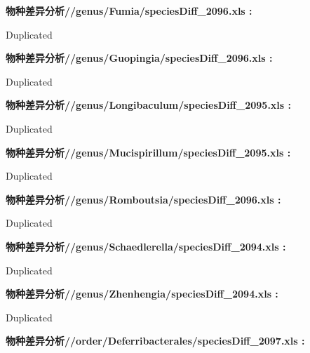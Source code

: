 \documentclass[
]{article}
\begin{document}
\begin{center}
\begin{tcolorbox}[colback=gray!10, colframe=gray!50, width=0.9\linewidth, arc=1mm, boxrule=0.5pt]
\vspace{2em}


\textbf{
物种差异分析//genus/Fumia/speciesDiff\_2096.xls
:}

\vspace{0.5em}

    Duplicated

\vspace{2em}


\textbf{
物种差异分析//genus/Guopingia/speciesDiff\_2096.xls
:}

\vspace{0.5em}

    Duplicated

\vspace{2em}


\textbf{
物种差异分析//genus/Longibaculum/speciesDiff\_2095.xls
:}

\vspace{0.5em}

    Duplicated

\vspace{2em}


\textbf{
物种差异分析//genus/Mucispirillum/speciesDiff\_2095.xls
:}

\vspace{0.5em}

    Duplicated

\vspace{2em}


\textbf{
物种差异分析//genus/Romboutsia/speciesDiff\_2096.xls
:}

\vspace{0.5em}

    Duplicated

\vspace{2em}


\textbf{
物种差异分析//genus/Schaedlerella/speciesDiff\_2094.xls
:}

\vspace{0.5em}

    Duplicated

\vspace{2em}


\textbf{
物种差异分析//genus/Zhenhengia/speciesDiff\_2094.xls
:}

\vspace{0.5em}

    Duplicated

\vspace{2em}


\textbf{
物种差异分析//order/Deferribacterales/speciesDiff\_2097.xls
:}


\end{tcolorbox}
\end{center}
\end{document}
